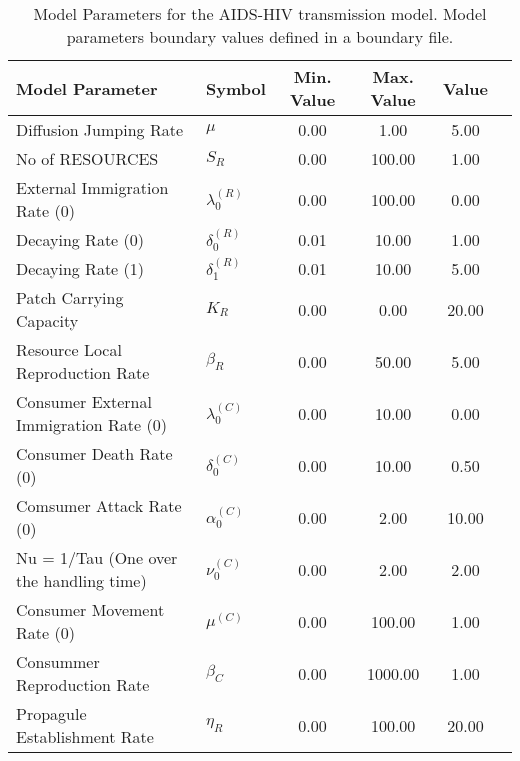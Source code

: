 \begin{table}
\centering
\begin{tabular}{p{5cm}lcccc}
{\bf Model Parameter} & {\bf Symbol} & {\bf Min. Value} & {\bf Max. Value} & {\bf Value}\\
\hline\hline
Diffusion Jumping Rate & $\mu$ & 0.00 & 1.00 & 5.00\\
No of RESOURCES & $S_R$ & 0.00 & 100.00 & 1.00\\
External Immigration Rate (0) & $\lambda^{(R)}_0$ & 0.00 & 100.00 & 0.00\\
Decaying Rate (0) & $\delta^{(R)}_0$ & 0.01 & 10.00 & 1.00\\
Decaying Rate (1) & $\delta^{(R)}_1$ & 0.01 & 10.00 & 5.00\\
Patch Carrying Capacity & $K_R$ & 0.00 & 0.00 & 20.00\\
Resource Local Reproduction Rate & $\beta_R$ & 0.00 & 50.00 & 5.00\\
Consumer External Immigration Rate (0) & $\lambda^{(C)}_0$ & 0.00 & 10.00 & 0.00\\
Consumer Death Rate (0) & $\delta^{(C)}_0$ & 0.00 & 10.00 & 0.50\\
Comsumer Attack Rate (0) & $\alpha^{(C)}_0$ & 0.00 & 2.00 & 10.00\\
Nu = 1/Tau (One over the handling time) & $\nu^{(C)}_0$ & 0.00 & 2.00 & 2.00\\
Consumer Movement Rate (0) & $\mu^{(C)}$ & 0.00 & 100.00 & 1.00\\
Consummer Reproduction Rate & $\beta_C$ & 0.00 & 1000.00 & 1.00\\
Propagule Establishment Rate & $\eta_R$ & 0.00 & 100.00 & 20.00\\
\hline\hline
\end{tabular}
\caption{Model Parameters for the AIDS-HIV transmission model. Model parameters boundary values defined in a boundary file.}
\end{table}
